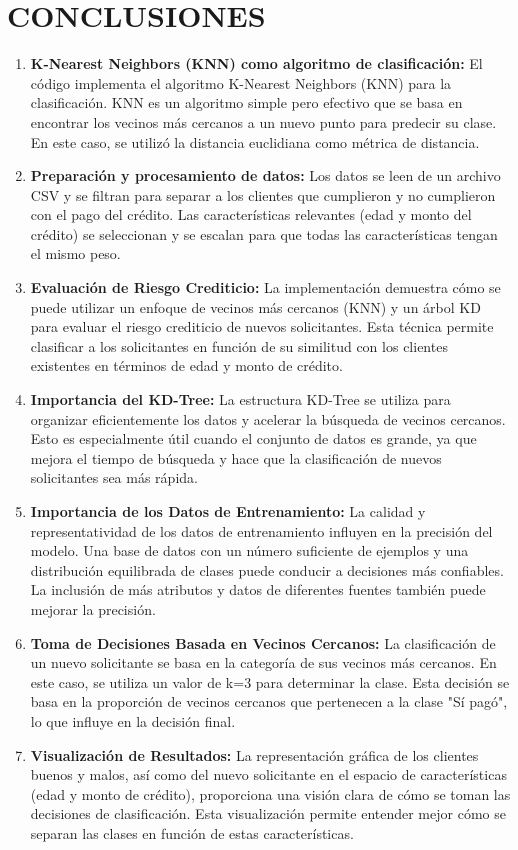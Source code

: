 \documentclass{article}
\begin{document}
\begin{sloppypar}
\section{CONCLUSIONES}

\begin{enumerate}
    \item \textbf{K-Nearest Neighbors (KNN) como algoritmo de clasificación:} El código implementa el algoritmo K-Nearest Neighbors (KNN) para la clasificación. KNN es un algoritmo simple pero efectivo que se basa en encontrar los vecinos más cercanos a un nuevo punto para predecir su clase. En este caso, se utilizó la distancia euclidiana como métrica de distancia.
    \item \textbf{Preparación y procesamiento de datos:} Los datos se leen de un archivo CSV y se filtran para separar a los clientes que cumplieron y no cumplieron con el pago del crédito. Las características relevantes (edad y monto del crédito) se seleccionan y se escalan para que todas las características tengan el mismo peso.
    \item \textbf{Evaluación de Riesgo Crediticio:} La implementación demuestra cómo se puede utilizar un enfoque de vecinos más cercanos (KNN) y un árbol KD para evaluar el riesgo crediticio de nuevos solicitantes. Esta técnica permite clasificar a los solicitantes en función de su similitud con los clientes existentes en términos de edad y monto de crédito.
    \item \textbf{Importancia del KD-Tree: }La estructura KD-Tree se utiliza para organizar eficientemente los datos y acelerar la búsqueda de vecinos cercanos. Esto es especialmente útil cuando el conjunto de datos es grande, ya que mejora el tiempo de búsqueda y hace que la clasificación de nuevos solicitantes sea más rápida.
    \item \textbf{Importancia de los Datos de Entrenamiento:} La calidad y representatividad de los datos de entrenamiento influyen en la precisión del modelo. Una base de datos con un número suficiente de ejemplos y una distribución equilibrada de clases puede conducir a decisiones más confiables. La inclusión de más atributos y datos de diferentes fuentes también puede mejorar la precisión.
    \item \textbf{Toma de Decisiones Basada en Vecinos Cercanos:} La clasificación de un nuevo solicitante se basa en la categoría de sus vecinos más cercanos. En este caso, se utiliza un valor de k=3 para determinar la clase. Esta decisión se basa en la proporción de vecinos cercanos que pertenecen a la clase "Sí pagó", lo que influye en la decisión final.
    \item \textbf{Visualización de Resultados: }La representación gráfica de los clientes buenos y malos, así como del nuevo solicitante en el espacio de características (edad y monto de crédito), proporciona una visión clara de cómo se toman las decisiones de clasificación. Esta visualización permite entender mejor cómo se separan las clases en función de estas características.


\end{enumerate}
\end{sloppypar}
\end{document}
